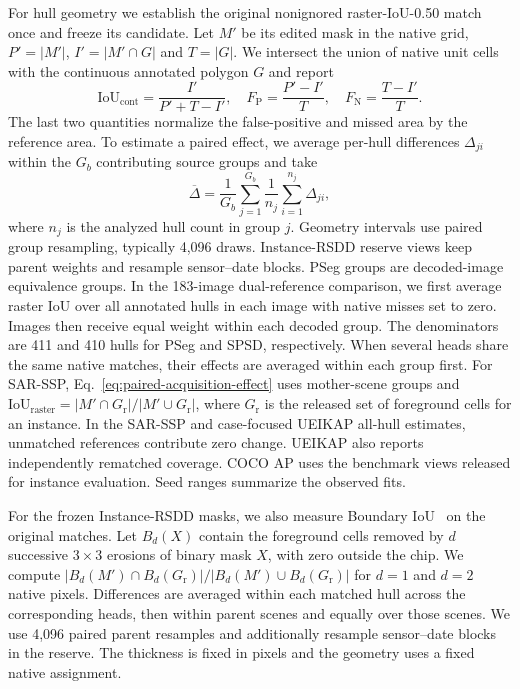 \documentclass[journal]{IEEEtran}
\begin{document}
For hull geometry we establish the original nonignored raster-IoU-0.50 match once and freeze its candidate. Let \(M'\) be its edited mask in the native grid, \(P'=|M'|\), \(I'=|M'\cap G|\) and \(T=|G|\). We intersect the union of native unit cells with the continuous annotated polygon \(G\) and report
\begin{equation}
 \mathrm{IoU}_{\mathrm{cont}}=\frac{I'}{P'+T-I'},\quad
 F_{\mathrm{P}}=\frac{P'-I'}{T},\quad F_{\mathrm{N}}=\frac{T-I'}{T}.
 \label{eq:fixed-geometry-metrics}
\end{equation}
The last two quantities normalize the false-positive and missed area by the reference area. To estimate a paired effect, we average per-hull differences \(\Delta_{ji}\) within the \(G_b\) contributing source groups and take
\begin{equation}
 \overline\Delta=\frac{1}{G_b}\sum_{j=1}^{G_b}
                 \frac{1}{n_j}\sum_{i=1}^{n_j}\Delta_{ji},
 \label{eq:paired-acquisition-effect}
\end{equation}
where \(n_j\) is the analyzed hull count in group \(j\). Geometry intervals use paired group resampling, typically 4,096 draws. Instance-RSDD reserve views keep parent weights and resample sensor--date blocks. PSeg groups are decoded-image equivalence groups. In the 183-image dual-reference comparison, we first average raster IoU over all annotated hulls in each image with native misses set to zero. Images then receive equal weight within each decoded group. The denominators are 411 and 410 hulls for PSeg and SPSD, respectively. When several heads share the same native matches, their effects are averaged within each group first. For SAR-SSP, Eq.~\eqref{eq:paired-acquisition-effect} uses mother-scene groups and \(\mathrm{IoU}_{\mathrm{raster}}=|M'\cap G_{\mathrm{r}}|/|M'\cup G_{\mathrm{r}}|\), where \(G_{\mathrm{r}}\) is the released set of foreground cells for an instance. In the SAR-SSP and case-focused UEIKAP all-hull estimates, unmatched references contribute zero change. UEIKAP also reports independently rematched coverage. COCO AP uses the benchmark views released for instance evaluation. Seed ranges summarize the observed fits.

For the frozen Instance-RSDD masks, we also measure Boundary IoU~\cite{boundaryiou} on the original matches. Let \(B_d(X)\) contain the foreground cells removed by \(d\) successive \(3\times3\) erosions of binary mask \(X\), with zero outside the chip. We compute \(|B_d(M')\cap B_d(G_{\mathrm r})|/|B_d(M')\cup B_d(G_{\mathrm r})|\) for \(d=1\) and \(d=2\) native pixels. Differences are averaged within each matched hull across the corresponding heads, then within parent scenes and equally over those scenes. We use 4,096 paired parent resamples and additionally resample sensor--date blocks in the reserve. The thickness is fixed in pixels and the geometry uses a fixed native assignment.
\end{document}
